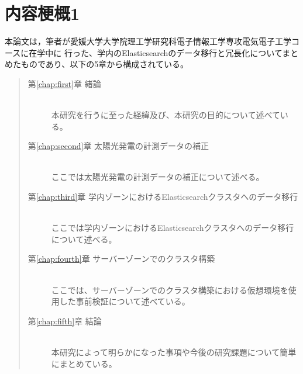 \chapter*{内容梗概1}

本論文は，筆者が愛媛大学大学院理工学研究科電子情報工学専攻電気電子工学コースに在学中に
行った、学内のElasticsearchのデータ移行と冗長化についてまとめたものであり、以下の5章から構成されている。\\

\begin{quote}
  \begin{description}

    \item[第\ref{chap:first}章 緒論]\ \\
          本研究を行うに至った経緯及び、本研究の目的について述べている。
          \vspace{3.0mm}
          
    \item[第\ref{chap:second}章 太陽光発電の計測データの補正]\ \\
          ここでは太陽光発電の計測データの補正について述べる。
          \vspace{3.0mm}
          
    \item[第\ref{chap:third}章 学内ゾーンにおけるElasticsearchクラスタへのデータ移行]\ \\
          ここでは学内ゾーンにおけるElasticsearchクラスタへのデータ移行について述べる。
          \vspace{3.0mm}
          
    \item[第\ref{chap:fourth}章 サーバーゾーンでのクラスタ構築]\ \\
          ここでは、サーバーゾーンでのクラスタ構築における仮想環境を使用した事前検証について述べている。
          \vspace{3.0mm}
          
    \item[第\ref{chap:fifth}章 結論]\ \\
          本研究によって明らかになった事項や今後の研究課題について簡単にまとめている。
          
  \end{description}
\end{quote}
